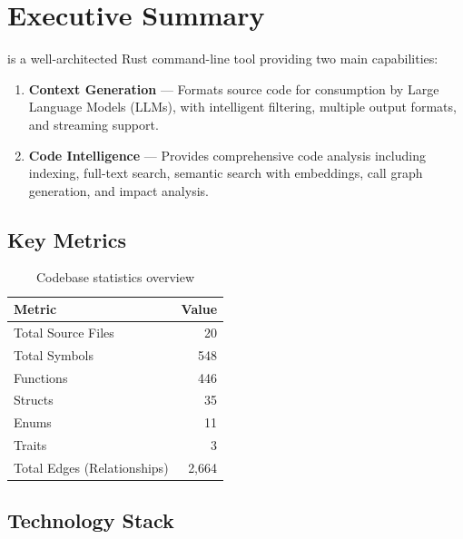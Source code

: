 
\section{Executive Summary}
\label{sec:executive-summary}

\ctx{} is a well-architected Rust command-line tool providing two main capabilities:

\begin{enumerate}
    \item \textbf{Context Generation} --- Formats source code for consumption by Large Language Models (LLMs), with intelligent filtering, multiple output formats, and streaming support.
    
    \item \textbf{Code Intelligence} --- Provides comprehensive code analysis including indexing, full-text search, semantic search with embeddings, call graph generation, and impact analysis.
\end{enumerate}

\subsection{Key Metrics}

\begin{table}[h]
\centering
\begin{tabular}{lr}
\toprule
\textbf{Metric} & \textbf{Value} \\
\midrule
Total Source Files & 20 \\
Total Symbols & 548 \\
Functions & 446 \\
Structs & 35 \\
Enums & 11 \\
Traits & 3 \\
Total Edges (Relationships) & 2,664 \\
\bottomrule
\end{tabular}
\caption{Codebase statistics overview}
\label{tab:overview-stats}
\end{table}

\subsection{Technology Stack}


